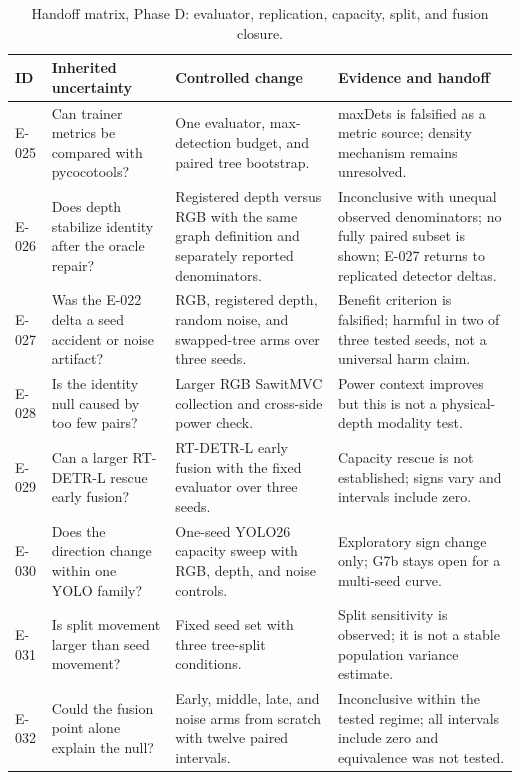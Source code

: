 \begin{table}[t]
\centering\footnotesize
\caption{Handoff matrix, Phase D: evaluator, replication, capacity, split, and fusion closure.}
\begin{tabularx}{\textwidth}{L{0.07\textwidth}L{0.24\textwidth}Y Y}
\toprule
\textbf{ID} & \textbf{Inherited uncertainty} & \textbf{Controlled change} & \textbf{Evidence and handoff}\\
\midrule
E-025 & Can trainer metrics be compared with pycocotools? & One evaluator, max-detection budget, and paired tree bootstrap. & maxDets is falsified as a metric source; density mechanism remains unresolved.\\
E-026 & Does depth stabilize identity after the oracle repair? & Registered depth versus RGB with the same graph definition and separately reported denominators. & Inconclusive with unequal observed denominators; no fully paired subset is shown; E-027 returns to replicated detector deltas.\\
E-027 & Was the E-022 delta a seed accident or noise artifact? & RGB, registered depth, random noise, and swapped-tree arms over three seeds. & Benefit criterion is falsified; harmful in two of three tested seeds, not a universal harm claim.\\
E-028 & Is the identity null caused by too few pairs? & Larger RGB SawitMVC collection and cross-side power check. & Power context improves but this is not a physical-depth modality test.\\
E-029 & Can a larger RT-DETR-L rescue early fusion? & RT-DETR-L early fusion with the fixed evaluator over three seeds. & Capacity rescue is not established; signs vary and intervals include zero.\\
E-030 & Does the direction change within one YOLO family? & One-seed YOLO26 capacity sweep with RGB, depth, and noise controls. & Exploratory sign change only; G7b stays open for a multi-seed curve.\\
E-031 & Is split movement larger than seed movement? & Fixed seed set with three tree-split conditions. & Split sensitivity is observed; it is not a stable population variance estimate.\\
E-032 & Could the fusion point alone explain the null? & Early, middle, late, and noise arms from scratch with twelve paired intervals. & Inconclusive within the tested regime; all intervals include zero and equivalence was not tested.\\
\bottomrule
\end{tabularx}
\end{table}

